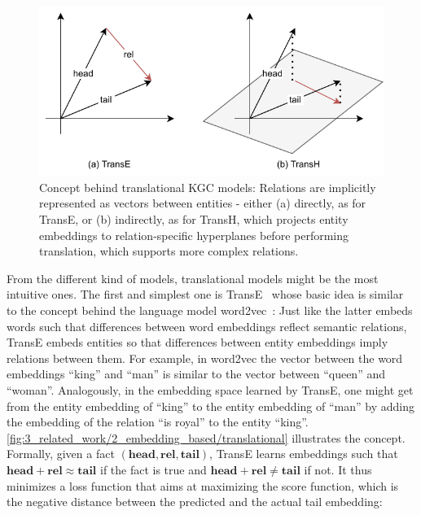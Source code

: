 \begin{figure}[t]
    \centering
    \includegraphics{3_related_work/2_embedding_based/translational}
    \caption{Concept behind translational KGC models: Relations are implicitly represented as vectors between entities - either (a) directly, as for TransE, or (b) indirectly, as for TransH, which projects entity embeddings to relation-specific hyperplanes before performing translation, which supports more complex relations.}
    \label{fig:3_related_work/2_embedding_based/translational}
\end{figure}

From the different kind of models, translational models might be the most intuitive ones. The first and simplest one is TransE~\cite{Bordes2013TranslatingEF} whose basic idea is similar to the concept behind the language model word2vec~\cite{Mikolov2013EfficientEO}: Just like the latter embeds words such that differences between word embeddings reflect semantic relations, TransE embeds entities so that differences between entity embeddings imply relations between them. For example, in word2vec the vector between the word embeddings ``king'' and ``man'' is similar to the vector between ``queen'' and ``woman''. Analogously, in the embedding space learned by TransE, one might get from the entity embedding of ``king'' to the entity embedding of ``man'' by adding the embedding of the relation ``is royal'' to the entity ``king''. \autoref{fig:3_related_work/2_embedding_based/translational} illustrates the concept. Formally, given a fact $(\textbf{head}, \textbf{rel}, \textbf{tail})$, TransE learns embeddings such that $\textbf{head} + \textbf{rel} \approx \textbf{tail}$ if the fact is true and $\textbf{head} + \textbf{rel} \neq \textbf{tail}$ if not. It thus minimizes a loss function that aims at maximizing the score function, which is the negative distance between the predicted and the actual tail embedding:


